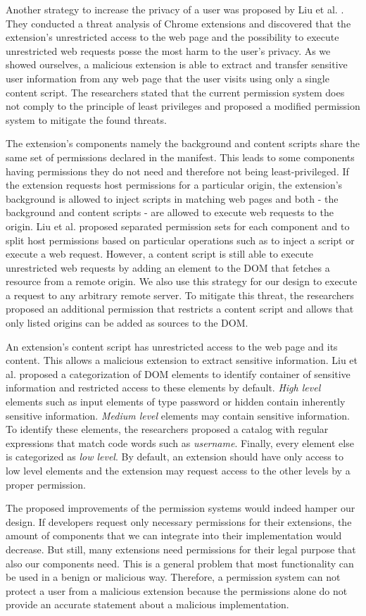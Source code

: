 	Another strategy to increase the privacy of a user was proposed by Liu et al. \cite{Liu12chromeextensions:}. They conducted a threat analysis of Chrome extensions and discovered that the extension's unrestricted access to the web page and the possibility to execute unrestricted web requests posse the most harm to the user's privacy. As we showed ourselves, a malicious extension is able to extract and transfer sensitive user information from any web page that the user visits using only a single content script. The researchers stated that the current permission system does not comply to the principle of least privileges and proposed a modified permission system to mitigate the found threats. 
	
	The extension's components namely the background and content scripts share the same set of permissions declared in the manifest. This leads to some components having permissions they do not need and therefore not being least-privileged. If the extension requests host permissions for a particular origin, the extension's background is allowed to inject scripts in matching web pages and both - the background and content scripts - are allowed to execute web requests to the origin. Liu et al. proposed separated permission sets for each component and to split host permissions based on particular operations such as to inject a script or execute a web request. However, a content script is still able to execute unrestricted web requests by adding an element to the DOM that fetches a resource from a remote origin. We also use this strategy for our design to execute a request to any arbitrary remote server. To mitigate this threat, the researchers proposed an additional permission that restricts a content script and allows that only listed origins can be added as sources to the DOM.
	
	An extension's content script has unrestricted access to the web page and its content. This allows a malicious extension to extract sensitive information. Liu et al. proposed a categorization of DOM elements to identify container of sensitive information and restricted access to these elements by default. \textit{High level} elements such as input elements of type password or hidden contain inherently sensitive information. \textit{Medium level} elements may contain sensitive information. To identify these elements, the researchers proposed a catalog with regular expressions that match code words such as \textit{username}. Finally, every element else is categorized as \textit{low level}. By default, an extension should have only access to low level elements and the extension may request access to the other levels by a proper permission.
	
	The proposed improvements of the permission systems would indeed hamper our design. If developers request only necessary permissions for their extensions, the amount of components that we can integrate into their implementation would decrease. But still, many extensions need permissions for their legal purpose that also our components need. This is a general problem that most functionality can be used in a benign or malicious way. Therefore, a permission system can not protect a user from a malicious extension because the permissions alone do not provide an accurate statement about a malicious implementation. 
